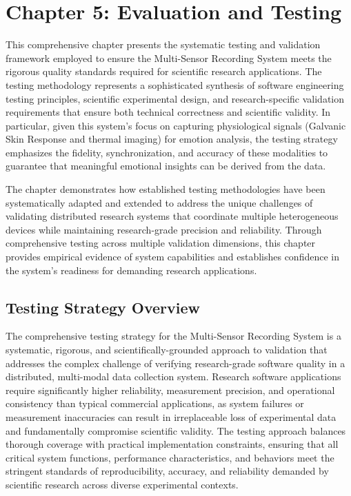 \documentclass[11pt,a4paper]{report}
\begin{document}
\label{chap:5}

\chapter{Chapter 5: Evaluation and Testing}

This comprehensive chapter presents the systematic testing and
validation framework employed to ensure the Multi-Sensor Recording
System meets the rigorous quality standards required for scientific
research applications. The testing methodology represents a
sophisticated synthesis of software engineering testing principles,
scientific experimental design, and research-specific validation
requirements that ensure both technical correctness and scientific
validity. In particular, given this system's focus on capturing
physiological signals (Galvanic Skin Response and thermal imaging) for
emotion analysis, the testing strategy emphasizes the fidelity,
synchronization, and accuracy of these modalities to guarantee that
meaningful emotional insights can be derived from the data.

The chapter demonstrates how established testing methodologies have been
systematically adapted and extended to address the unique challenges of
validating distributed research systems that coordinate multiple
heterogeneous devices while maintaining research-grade precision and
reliability. Through comprehensive testing across multiple validation
dimensions, this chapter provides empirical evidence of system
capabilities and establishes confidence in the system's readiness for
demanding research applications.

\section{Testing Strategy Overview}

The comprehensive testing strategy for the Multi-Sensor Recording System
is a systematic, rigorous, and scientifically-grounded approach to
validation that addresses the complex challenge of verifying
research-grade software quality in a distributed, multi-modal data
collection system. Research software applications require significantly
higher reliability, measurement precision, and operational consistency
than typical commercial applications, as system failures or measurement
inaccuracies can result in irreplaceable loss of experimental data and
fundamentally compromise scientific validity. The testing approach
balances thorough coverage with practical implementation constraints,
ensuring that all critical system functions, performance
characteristics, and behaviors meet the stringent standards of
reproducibility, accuracy, and reliability demanded by scientific
research across diverse experimental contexts.
\end{document}

